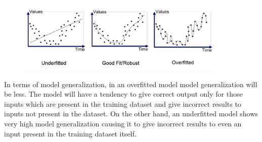 \begin{figure}[htp]
    \centering
    \includegraphics[width=10cm]{Images/A7_img1.png}
\end{figure}
\vspace{1cm}
  In terms of model generalization, in an overfitted model model generalization will be less. The model will have a tendency to give correct output only for those inputs which are present in the training dataset and give incorrect results to inputs not present in the dataset. On the other hand, an underfitted model shows very high model generalization causing it to give incorrect results to even an input present in the training dataset itself. 